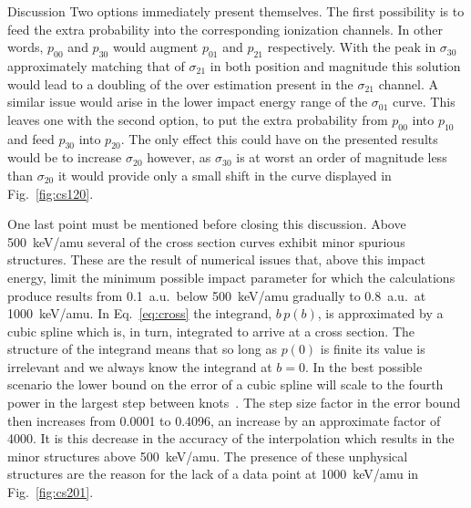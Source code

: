 \documentclass[aps, pra, reprint, groupedaddress, amsfonts, longbibliography,
               amsmath, amssymb, showpacs, nofootinbib]{revtex4-1}
\begin{document}
\begin{section}{Discussion \label{sec:disc}}
   Two options immediately present themselves. The first possibility is to feed the extra probability
   into the corresponding ionization channels. In other words, $p_{00}$ and $p_{30}$ would augment
   $p_{01}$ and $p_{21}$ respectively. With the peak in $\sigma_{30}$ approximately matching that of
   $\sigma_{21}$ in both position and magnitude this solution would lead to a doubling of the over
   estimation present in the $\sigma_{21}$ channel. A similar issue would arise in the lower impact
   energy range of the $\sigma_{01}$ curve. This leaves one with the second option, to put the extra
   probability from $p_{00}$ into $p_{10}$ and feed $p_{30}$ into $p_{20}$. The only effect this could
   have on the presented results would be to increase $\sigma_{20}$ however, as $\sigma_{30}$ is at
   worst an order of magnitude less than $\sigma_{20}$ it would provide only a small shift in the curve
   displayed in Fig.~\ref{fig:cs120}.

   One last point must be mentioned before closing this discussion. Above 500~keV/amu several of the
   cross section curves exhibit minor spurious structures. These are the result of numerical issues
   that, above this impact energy, limit the minimum possible impact parameter for which the
   calculations produce results from 0.1~a.u.\ below 500~keV/amu gradually to 0.8~a.u.\ at 1000~keV/amu.
   In Eq.~\eqref{eq:cross} the integrand, $b \, p(b)$, is approximated by a cubic spline which is, in
   turn, integrated to arrive at a cross section. The structure of the integrand means that so long as
   $p(0)$ is finite its value is irrelevant and we always know the integrand at $b = 0$. In the best
   possible scenario the lower bound on the error of a cubic spline will scale to the fourth power in
   the largest step between knots~\cite{spline-err}. The step size factor in the error bound then
   increases from 0.0001 to 0.4096, an increase by an approximate factor of 4000. It is this decrease in
   the accuracy of the interpolation which results in the minor structures above 500~keV/amu. The
   presence of these unphysical structures are the reason for the lack of a data point at 1000~keV/amu
   in Fig.~\ref{fig:cs201}.

\end{section}
\end{document}
